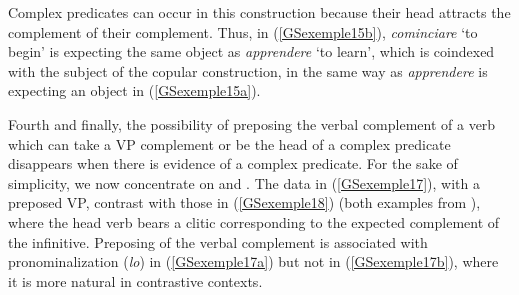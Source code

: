 Complex predicates can occur in this construction because their head attracts the complement of their complement. Thus, in (\ref{GSexemple15b}), \emph{cominciare} `to begin' is expecting the same object as \emph{apprendere} `to learn', which is coindexed with the\pagebreak{} subject of the copular construction, in the same way as \emph{apprendere} is expecting an object in (\ref{GSexemple15a}). 

\largerpage
Fourth and finally, the possibility of preposing the verbal complement of a verb which can take a VP complement or be the head of a complex predicate disappears when there is evidence of a complex predicate. For the sake of simplicity, we now concentrate on  and . The data in (\ref{GSexemple17}), with a preposed VP, contrast with those in (\ref{GSexemple18}) (both examples from \citealt[132]{AG2010}), where the head verb bears a clitic corresponding to the expected complement of the infinitive. Preposing of the verbal complement is associated with pronominalization (\emph{lo}) in  (\ref{GSexemple17a}) but not in  (\ref{GSexemple17b}), where it is more natural in contrastive contexts.

\begin{exe}
	\label{GSexemple17} 
	\begin{xlist}
	\label{GSexemple17a}
		 
	\label{GSexemple17b}
	\end{xlist}
\end{exe}

\eal
	\label{GSexemple18} 
    \label{GSexemple18a} 	
	
